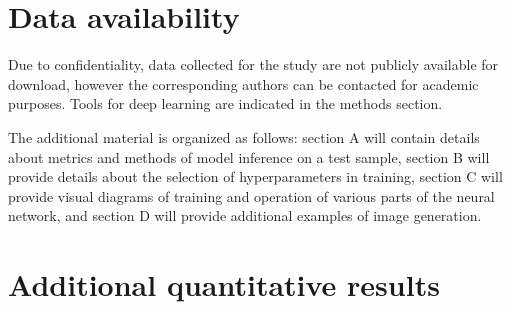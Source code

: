 \documentclass{article}
\begin{document}
\section{Data availability}
Due to confidentiality, data collected for the study are not publicly available for download, however the corresponding authors can be contacted for academic purposes. Tools for deep learning are indicated in the methods
section.




\newpage
\appendix
The additional material is organized as follows: section A will contain details about metrics and methods of model inference on a test sample, section B will provide details about the selection of hyperparameters in training, section C will provide visual diagrams of training and operation of various parts of the neural network, and section D will provide additional examples of image generation.

\section{Additional quantitative results}
\end{document}
